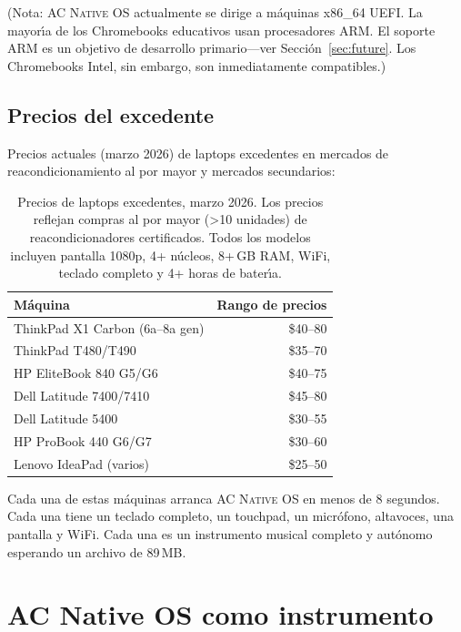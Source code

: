 \documentclass[10pt,letterpaper,twocolumn]{article}
\newcommand{\acos}{\textsc{AC Native OS}}
\begin{document}
(Nota: \acos{} actualmente se dirige a m\'{a}quinas x86\_64 UEFI. La mayor\'{\i}a de los Chromebooks educativos usan procesadores ARM. El soporte ARM es un objetivo de desarrollo primario---ver Secci\'{o}n~\ref{sec:future}. Los Chromebooks Intel, sin embargo, son inmediatamente compatibles.)

\subsection{Precios del excedente}

Precios actuales (marzo 2026) de laptops excedentes en mercados de reacondicionamiento al por mayor y mercados secundarios:

\begin{table}[h]
\small
\centering
\begin{tabular}{lr}
\toprule
\textbf{M\'{a}quina} & \textbf{Rango de precios} \\
\midrule
ThinkPad X1 Carbon (6a--8a gen) & \$40--80 \\
ThinkPad T480/T490 & \$35--70 \\
HP EliteBook 840 G5/G6 & \$40--75 \\
Dell Latitude 7400/7410 & \$45--80 \\
Dell Latitude 5400 & \$30--55 \\
HP ProBook 440 G6/G7 & \$30--60 \\
Lenovo IdeaPad (varios) & \$25--50 \\
\bottomrule
\end{tabular}
\caption{Precios de laptops excedentes, marzo 2026. Los precios reflejan compras al por mayor (\textgreater 10 unidades) de reacondicionadores certificados. Todos los modelos incluyen pantalla 1080p, 4+ n\'{u}cleos, 8+\,GB RAM, WiFi, teclado completo y 4+ horas de bater\'{\i}a.}
\label{tab:surplus}
\end{table}

Cada una de estas m\'{a}quinas arranca \acos{} en menos de 8 segundos. Cada una tiene un teclado completo, un touchpad, un micr\'{o}fono, altavoces, una pantalla y WiFi. Cada una es un instrumento musical completo y aut\'{o}nomo esperando un archivo de 89\,MB.


\section{AC Native OS como instrumento}
\label{sec:instrument}
\end{document}
